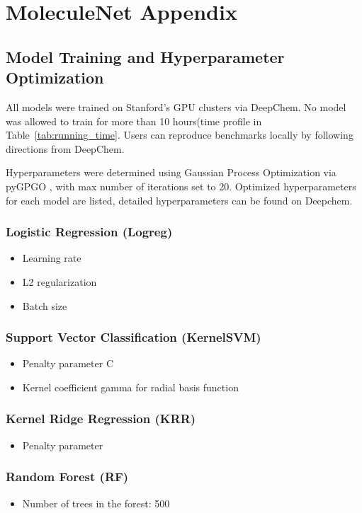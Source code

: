 
\section{MoleculeNet Appendix}

\subsection{Model Training and Hyperparameter Optimization}
All models were trained on Stanford's GPU clusters via DeepChem. No model was allowed to train for more than 10 hours(time profile in Table~\ref{tab:running_time}. Users can reproduce benchmarks locally by following directions from DeepChem.

Hyperparameters were determined using Gaussian Process Optimization via pyGPGO \cite{jimenez2017pygpgo}, with max number of iterations set to 20. Optimized hyperparameters for each model are listed, detailed hyperparameters can be found on Deepchem.

\subsubsection{Logistic Regression (Logreg)}
\begin{itemize}
    \item Learning rate
    \item L2 regularization
    \item Batch size
\end{itemize}

\subsubsection{Support Vector Classification (KernelSVM)}
\begin{itemize}
    \item Penalty parameter C
    \item Kernel coefficient gamma for radial basis function
\end{itemize}

\subsubsection{Kernel Ridge Regression (KRR)}
\begin{itemize}
    \item Penalty parameter
\end{itemize}

\subsubsection{Random Forest (RF)}
\begin{itemize}
    \item Number of trees in the forest: 500
\end{itemize}

